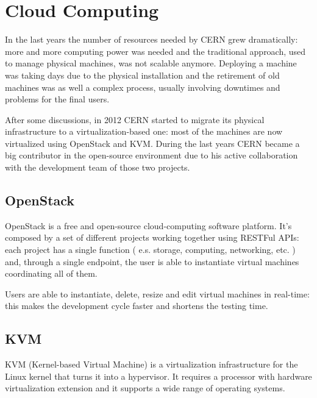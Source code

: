 \section{Cloud Computing}

In the last years the number of resources needed by CERN grew
dramatically: more and more computing power was needed and the traditional
approach, used to manage physical machines, was not scalable anymore.
Deploying a machine was taking days due to the physical installation and
the retirement of old machines was as well a complex process, usually
involving downtimes and problems for the final users.

After some discussions, in 2012 CERN started to migrate its physical
infrastructure to a virtualization-based one: most of the machines are now
virtualized using OpenStack and KVM. During the last years CERN became
a big contributor in the open-source environment due to his active
collaboration with the development team of those two projects.

\subsection{OpenStack}

OpenStack is a free and open-source cloud-computing software platform.
It's composed by a set of different projects working together using
RESTFul APIs: each project has a single function ( e.s. storage,
computing, networking, etc. ) and, through a single endpoint, the user is
able to instantiate virtual machines coordinating all of them.

Users are able to instantiate, delete, resize and edit virtual machines in
real-time: this makes the development cycle faster and shortens the
testing time.

\subsection{KVM}

KVM (Kernel-based Virtual Machine) is a virtualization infrastructure for
the Linux kernel that turns it into a hypervisor. It requires a processor
with hardware virtualization extension and it supports a wide range of
operating systems.
